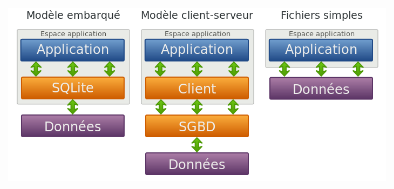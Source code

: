 \documentclass[svgnames,11pt]{beamer}
\begin{document}
\begin{frame}
    \frametitle{}

    \begin{center}
        \centering
        \includegraphics[width=10cm]{ressources/modeles.png}
        \label{IMG}
    \end{center}

\end{frame}
\end{document}
